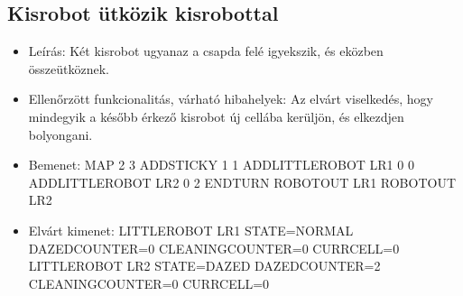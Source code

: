 \subsection{Kisrobot ütközik kisrobottal}
\begin{itemize}
	\item Leírás: \newline
	Két kisrobot ugyanaz a csapda felé igyekszik, és eközben összeütköznek.
	\item Ellenőrzött funkcionalitás, várható hibahelyek: \newline
	Az elvárt viselkedés, hogy mindegyik a később érkező kisrobot új cellába kerüljön, és elkezdjen bolyongani.
	
	\item Bemenet: \newline
	MAP 2 3 \newline
	ADDSTICKY 1 1 \newline
	ADDLITTLEROBOT LR1 0 0 \newline
	ADDLITTLEROBOT LR2 0 2 \newline
	ENDTURN \newline
	ROBOTOUT LR1 \newline
	ROBOTOUT LR2 \newline
	
	\item Elvárt kimenet: \newline
	LITTLEROBOT LR1 STATE=NORMAL DAZEDCOUNTER=0 CLEANINGCOUNTER=0 CURRCELL=0 \newline
	LITTLEROBOT LR2 STATE=DAZED DAZEDCOUNTER=2 CLEANINGCOUNTER=0 CURRCELL=0 \newline


\end{itemize}

